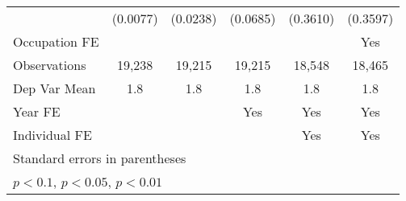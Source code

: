 {\begin{tabular}{l*{5}{c}}
                    &    (0.0077)         &    (0.0238)         &    (0.0685)         &    (0.3610)         &    (0.3597)         \\
[1em]
Occupation FE       &                     &                     &                     &                     &         Yes         \\
\hline
Observations        &      19,238         &      19,215         &      19,215         &      18,548         &      18,465         \\
Dep Var Mean        &         1.8         &         1.8         &         1.8         &         1.8         &         1.8         \\
Year FE             &                     &                     &         Yes         &         Yes         &         Yes         \\
Individual FE       &                     &                     &                     &         Yes         &         Yes         \\
\hline\hline
\multicolumn{6}{l}{\footnotesize Standard errors in parentheses}\\
\multicolumn{6}{l}{\footnotesize \sym{*} \(p<0.1\), \sym{**} \(p<0.05\), \sym{***} \(p<0.01\)}\\
\end{tabular}
}
